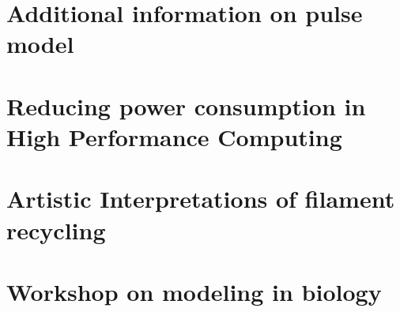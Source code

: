 \documentclass{easychithesis}
\begin{document}
\chapter{Additional information on pulse model}
\label{chap:morepulse}



\chapter{Reducing power consumption in High Performance Computing}


%
%


\chapter{Artistic Interpretations of filament recycling}


%

\chapter{Workshop on modeling in biology}



%
%

\singlespacing
\pagebreak


\end{document}
